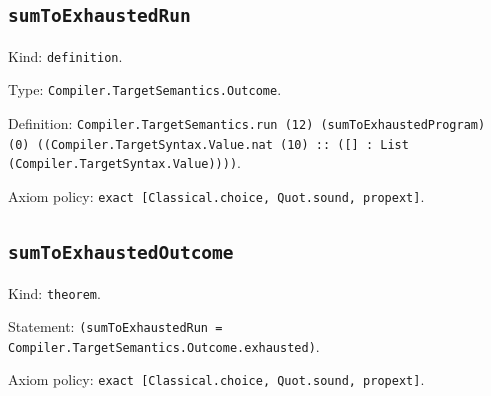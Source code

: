 \documentclass[11pt]{article}
\begin{document}
\subsection*{\texttt{sumToExhaustedRun}}
\noindent Kind: \texttt{definition}.\par
\noindent Type: \texttt{Compiler.TargetSemantics.Outcome}.\par
\noindent Definition: \texttt{Compiler.TargetSemantics.run (12) (sumToExhaustedProgram) (0) ((Compiler.TargetSyntax.Value.nat (10) :: ([] : List (Compiler.TargetSyntax.Value))))}.\par
\noindent Axiom policy: \texttt{exact [Classical.choice, Quot.sound, propext]}.\par
\subsection*{\texttt{sumToExhaustedOutcome}}
\noindent Kind: \texttt{theorem}.\par
\noindent Statement: \texttt{(sumToExhaustedRun = Compiler.TargetSemantics.Outcome.exhausted)}.\par
\noindent Axiom policy: \texttt{exact [Classical.choice, Quot.sound, propext]}.\par
\end{document}
